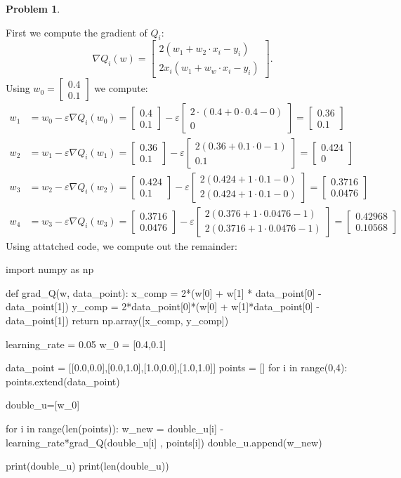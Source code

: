 \documentclass[12pt, a4paper]{article}
\title{}
\author{A.N.}
\date{\today}
\newtheorem{problem}{Problem}
\theoremstyle{definition}
\newcommand{\grad}{\nabla}
\newcommand{\ep}{\varepsilon}
\newcommand{\bmat}[1]{\begin{bmatrix}#1\end{bmatrix}}
\begin{document}
	
	
	
	\begin{problem}
	\end{problem}
	First we compute the gradient of $Q_i$: 
	$$ \grad Q_i(w) = \bmat{2(w_1 + w_2 \cdot x_i - y_i ) \\ 2x_i(w_1 + w_w \cdot x_i - y_i)} .$$
	Using $w_0 = \bmat{0.4 \\ 0.1}$ we compute: 
	\begin{align*}
		w_1 & = w_0 - \ep\grad Q_i(w_0) = \bmat{0.4 \\ 0.1} - \ep \bmat{ 2 \cdot (0.4+ 0 \cdot 0.4 - 0) \\ 0} = \bmat{0.36 \\ 0.1} 
		\\ w_2 & = w_1 - \ep \grad Q_i ( w_1) = \bmat{0.36 \\ 0.1 } - \ep \bmat{2(0.36 + 0.1 \cdot 0 - 1) \\ 0.1}  = \bmat{0.424 \\ 0}
		\\ w_3 & = w_2 -\ep \grad Q_i (w_2) = \bmat{0.424 \\ 0.1 } - \ep \bmat{2 ( 0.424 + 1 \cdot 0.1 - 0) \\ 2(0.424 + 1 \cdot 0.1 - 0)} = \bmat{0.3716 \\ 0.0476}
		\\ w_4 & = w_3 - \ep \grad Q_i (w_3)  = \bmat{0.3716 \\ 0.0476} - \ep \bmat{2 (0.376 + 1 \cdot 0.0476  - 1) \\ 2 (0.3716 + 1 \cdot 0.0476 - 1)} = \bmat{0.42968 \\ 0.10568}
	\end{align*}
	Using attatched code, we compute out the remainder: 
	\begin{python}
		import numpy as np
		
		def grad_Q(w, data_point):
		x_comp = 2*(w[0] + w[1] * data_point[0] - data_point[1])
		y_comp = 2*data_point[0]*(w[0] + w[1]*data_point[0] - data_point[1])
		return np.array([x_comp, y_comp])
		
		learning_rate = 0.05
		w_0 = [0.4,0.1]
		
		data_point = [[0.0,0.0],[0.0,1.0],[1.0,0.0],[1.0,1.0]]
		points = []
		for i in range(0,4):
		points.extend(data_point)
		
		double_u=[w_0]
		
		for i in range(len(points)):
		w_new = double_u[i] - learning_rate*grad_Q(double_u[i] , points[i])
		double_u.append(w_new)
		
		print(double_u)
		print(len(double_u))
	\end{python}
\end{document}
